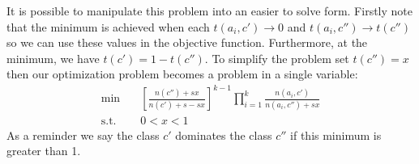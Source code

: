 It is possible to manipulate this problem into an easier to solve form.
Firstly note that the minimum is achieved when each $t(a_i, c') \rightarrow 0$ and $t(a_i, c'') \rightarrow t(c'')$ so we can use these values in the objective function.
Furthermore, at the minimum, we have $t(c') = 1 - t(c'')$.
To simplify the problem set $t(c'') = x$ then our optimization problem becomes a problem in a single variable:
\begin{align}
	\min \quad & \left[ \frac{n(c'') + sx}{n(c')+s - sx} \right]^{k-1} \prod_{i=1}^k \frac{n(a_i, c')}{n(a_i, c'') + sx} \\
	\text{s.t.} \quad & 0 < x < 1
\end{align}
As a reminder we say the class $c'$ dominates the class $c''$ if this minimum is greater than 1.
